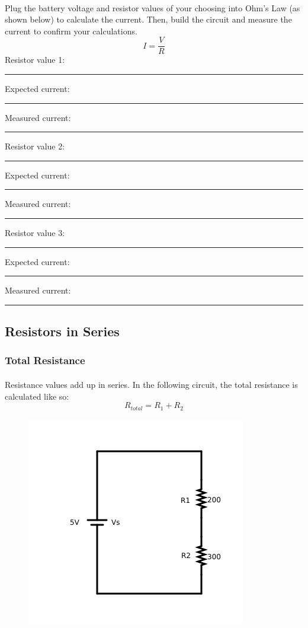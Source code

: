 \documentclass{article}
\begin{document}
\paragraph{}
Plug the battery voltage and resistor values of your choosing into Ohm's Law (as shown below) to calculate the current. Then, build the circuit and measure the current to confirm your calculations.
\begin{equation*}
  I = \frac{V}{R}
\end{equation*}
\noindent
Resistor value 1: \rule{2cm}{0.15mm} Expected current: \rule{2cm}{0.15mm} Measured current: \rule{2cm}{0.15mm}
\newline
\newline
Resistor value 2: \rule{2cm}{0.15mm} Expected current: \rule{2cm}{0.15mm} Measured current: \rule{2cm}{0.15mm}
\newline
\newline
Resistor value 3: \rule{2cm}{0.15mm} Expected current: \rule{2cm}{0.15mm} Measured current: \rule{2cm}{0.15mm}
\newline
\newline

\newpage
\subsection{Resistors in Series}
\subsubsection{Total Resistance}
\paragraph{}
Resistance values add up in series. In the following circuit, the total resistance is calculated like so:
\begin{equation*}
  R_{total} = R_1 + R_2
\end{equation*}
\paragraph{}
\begin{figure}[H]
  \centering
  \includegraphics[width=0.4\linewidth]{pngs/07-resistors-series.png}
\end{figure}
\end{document}

